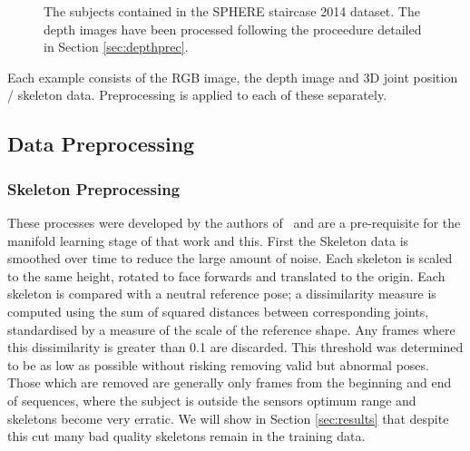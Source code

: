 \documentclass[11pt]{article} %
\begin{document}
\begin{figure}
\qquad
{}%
\qquad
{}%
\caption{The subjects contained in the SPHERE staircase 2014 dataset. The depth images have been processed following the proceedure detailed in Section \ref{sec:depthprec}. }
\label{fig:subjects}
\end{figure}

Each example consists of the RGB image, the depth image and 3D joint position / skeleton data. Preprocessing is applied to each of these separately.

\subsection{Data Preprocessing}

\subsubsection{Skeleton Preprocessing}
\label{sec:skelPreproc}

These processes were developed by the authors of~\cite{Paiement} and are a pre-requisite for the manifold learning stage of that work and this. First the Skeleton data is smoothed over time to reduce the large amount of noise. Each skeleton is scaled to the same height, rotated to face forwards and translated to the origin. Each skeleton is compared with a neutral reference pose;  a dissimilarity measure is computed  using the sum of squared distances between corresponding joints, standardised by a measure of the scale of the reference shape. Any frames where this dissimilarity is greater than 0.1 are discarded. This threshold was determined to be as low as possible without risking removing valid but abnormal poses. Those which are removed are generally only frames from the beginning and end of sequences, where the subject is outside the sensors optimum range and skeletons become very erratic. We will show in Section \ref{sec:results} that despite this cut many bad quality skeletons remain in the training data.
\end{document}
